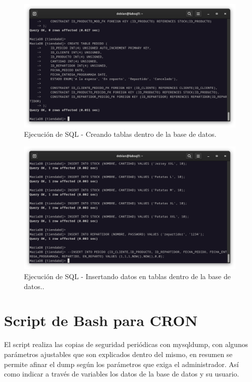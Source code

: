 \begin{figure}[H]
	\centering
	\includegraphics[scale=0.30]{05}
	\caption{Ejecución de SQL - Creando tablas dentro de la base de datos.}
\end{figure}

\begin{figure}[H]
	\centering
	\includegraphics[scale=0.30]{06}
	\caption{Ejecución de SQL - Insertando datos en tablas dentro de la base de datos..}
\end{figure}

\newpage
\section{Script de Bash para CRON}

El script realiza las copias de seguridad periódicas con mysqldump, con algunos parámetros ajustables que son explicados dentro del mismo, en resumen se permite afinar el dump según los parámetros que exiga el administrador. Así como indicar a través de variables los datos de la base de datos y su usuario. 
\vspace{5mm}

